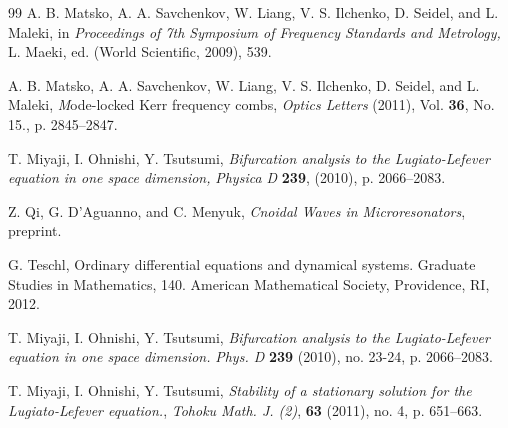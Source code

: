 \documentclass[12pt]{amsart}
\theoremstyle{definition}
\theoremstyle{remark}
\numberwithin{equation}{section}
\renewcommand{\(}{\left(}
\renewcommand{\)}{\right)}
\renewcommand{\[}{\left[}
\renewcommand{\]}{\right]}
\begin{document}
\begin{thebibliography}{99}
 A. B. Matsko, A. A. Savchenkov, W. Liang, V. S. Ilchenko, D.
Seidel, and L. Maleki, in {\em Proceedings of 7th Symposium of Frequency Standards and Metrology,}  L. Maeki, ed. (World Scientific, 2009), 539.

 A. B. Matsko, A. A. Savchenkov, W. Liang, V. S. Ilchenko, D. Seidel, and L. Maleki, {\emph Mode-locked Kerr frequency combs}, {\em Optics Letters} (2011),   Vol. {\bf 36},  No. 15., p. 2845--2847.

 T. Miyaji, I. Ohnishi, Y. Tsutsumi, \emph{Bifurcation analysis to the Lugiato-Lefever equation in one space dimension,} {\em Physica D} {\bf 239}, (2010), p.  2066--2083.

 Z. Qi, G. D'Aguanno, and C. Menyuk, \emph{Cnoidal Waves in Microresonators}, preprint.

 G. Teschl,  Ordinary differential equations and dynamical systems. Graduate Studies in Mathematics, 140. American Mathematical Society, Providence, RI, 2012.




  T. Miyaji, I. Ohnishi,  Y.  Tsutsumi,  \emph{Bifurcation analysis to the Lugiato-Lefever equation in one space dimension.} {\em  Phys. D} {\bf 239} (2010), no. 23-24, p. 2066--2083.


   T. Miyaji, I. Ohnishi,  Y.  Tsutsumi,  \emph{Stability of a stationary solution for the Lugiato-Lefever equation.}, {\em Tohoku Math. J.  (2)}, {\bf 63}  (2011), no. 4, p. 651--663.


\end{thebibliography}
\end{document}
